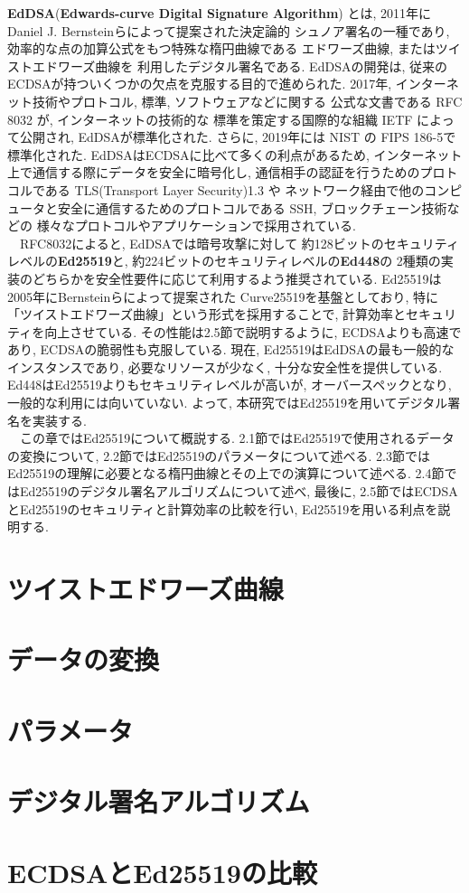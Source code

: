 \textbf{EdDSA}(\textbf{Edwards-curve Digital Signature Algorithm})
とは, 2011年にDaniel J. Bernsteinらによって提案された決定論的
シュノア署名\cite{schnorr}の一種であり, 効率的な点の加算公式をもつ特殊な楕円曲線である
エドワーズ曲線, またはツイストエドワーズ曲線\cite{twisted}を
利用したデジタル署名である.\cite{high-speed}
EdDSAの開発は, 従来のECDSAが持ついくつかの欠点を克服する目的で進められた.
2017年, インターネット技術やプロトコル, 標準, ソフトウェアなどに関する
公式な文書である RFC 8032 \cite{8032}が, インターネットの技術的な
標準を策定する国際的な組織 IETF によって公開され, EdDSAが標準化された.
さらに, 2019年には
NIST の FIPS 186-5で標準化された.
EdDSAはECDSAに比べて多くの利点があるため, 
インターネット上で通信する際にデータを安全に暗号化し, 
通信相手の認証を行うためのプロトコルである 
TLS(Transport Layer Security)1.3 \cite{rfc8446}や
ネットワーク経由で他のコンピュータと安全に通信するためのプロトコルである 
SSH, ブロックチェーン技術などの
様々なプロトコルやアプリケーションで採用されている\cite{monero}.\\
　RFC8032によると, EdDSAでは暗号攻撃に対して
約128ビットのセキュリティレベルの\textbf{Ed25519}と, 
約224ビットのセキュリティレベルの\textbf{Ed448}の
2種類の実装のどちらかを安全性要件に応じて利用するよう推奨されている.
Ed25519は2005年にBernsteinらによって提案された
Curve25519\cite{curve25519}を基盤としており, 特に
「ツイストエドワーズ曲線」という形式を採用することで, 
計算効率とセキュリティを向上させている.
その性能は2.5節で説明するように, ECDSAよりも高速であり, 
ECDSAの脆弱性も克服している.
現在, Ed25519はEdDSAの最も一般的なインスタンスであり, 
必要なリソースが少なく, 十分な安全性を提供している.
Ed448はEd25519よりもセキュリティレベルが高いが,
オーバースペックとなり, 一般的な利用には向いていない.
よって, 本研究ではEd25519を用いてデジタル署名を実装する.\\
　この章ではEd25519について概説する.
2.1節ではEd25519で使用されるデータの変換について, 
2.2節ではEd25519のパラメータについて述べる.
2.3節ではEd25519の理解に必要となる楕円曲線とその上での演算について述べる.
2.4節ではEd25519のデジタル署名アルゴリズムについて述べ,
最後に, 2.5節ではECDSAとEd25519のセキュリティと計算効率の比較を行い, 
Ed25519を用いる利点を説明する.\\
\section{ツイストエドワーズ曲線}

\section{データの変換}

\newpage
\section{パラメータ}

\section{デジタル署名アルゴリズム}

\section{ECDSAとEd25519の比較}
